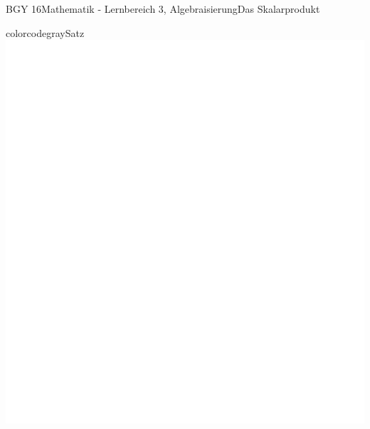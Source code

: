 \documentclass[oneside,openany,headings=optiontotoc,11pt,numbers=noenddot]{scrreprt}
\begin{document}
\begin{worksheet}{BGY 16}{Mathematik - Lernbereich 3, Algebraisierung}{Das Skalarprodukt}
\begin{framed}
		\end{framed}
		\begin{framed}
			\tiny{color{codegray}Satz}\\
			\includegraphics[scale=0.33]{../empty.jpg}
		\end{framed}
	\end{worksheet}
\end{document}
